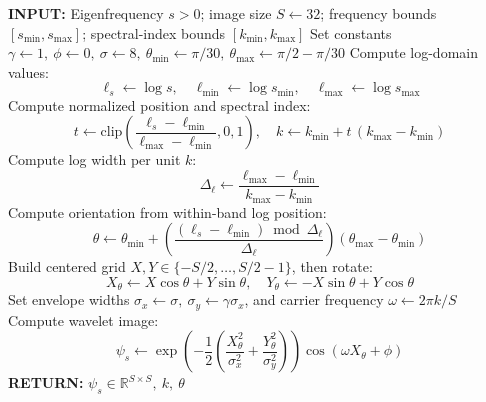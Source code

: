 \documentclass[preprint,review,12pt]{elsarticle}
\begin{document}
\begin{algorithm}[H]
\caption{Eigenfrequency Wavelet Encoding}
\label{alg:eigenfrequency_wavelet_encoding}
\begin{algorithmic}[1]
\STATE \textbf{INPUT:} Eigenfrequency \( s>0 \); image size \( S \leftarrow 32 \); frequency bounds \( [s_{\min}, s_{\max}] \); spectral-index bounds \( [k_{\min}, k_{\max}] \)
\STATE Set constants \( \gamma \leftarrow 1,\ \phi \leftarrow 0,\ \sigma \leftarrow 8,\ \theta_{\min}\leftarrow \pi/30,\ \theta_{\max}\leftarrow \pi/2-\pi/30 \)
\STATE Compute log-domain values:
\[
\ell_s \leftarrow \log s,\quad \ell_{\min}\leftarrow \log s_{\min},\quad \ell_{\max}\leftarrow \log s_{\max}
\]
\STATE Compute normalized position and spectral index:
\[
t \leftarrow \mathrm{clip}\!\left(\frac{\ell_s-\ell_{\min}}{\ell_{\max}-\ell_{\min}},0,1\right),\quad
k \leftarrow k_{\min} + t\,(k_{\max}-k_{\min})
\]
\STATE Compute log width per unit \(k\):
\[
\Delta_\ell \leftarrow \frac{\ell_{\max}-\ell_{\min}}{k_{\max}-k_{\min}}
\]
\STATE Compute orientation from within-band log position:
\[
\theta \leftarrow \theta_{\min} + \left(\frac{(\ell_s-\ell_{\min})\bmod \Delta_\ell}{\Delta_\ell}\right)\left(\theta_{\max}-\theta_{\min}\right)
\]
\STATE Build centered grid \(X,Y \in \{-S/2,\dots,S/2-1\}\), then rotate:
\[
X_\theta \leftarrow X\cos\theta + Y\sin\theta,\quad
Y_\theta \leftarrow -X\sin\theta + Y\cos\theta
\]
\STATE Set envelope widths \( \sigma_x \leftarrow \sigma,\ \sigma_y \leftarrow \gamma \sigma_x \), and carrier frequency \( \omega \leftarrow 2\pi k/S \)
\STATE Compute wavelet image:
\[
\psi_s \leftarrow
\exp\!\left(-\frac{1}{2}\left(\frac{X_\theta^2}{\sigma_x^2}+\frac{Y_\theta^2}{\sigma_y^2}\right)\right)\cos(\omega X_\theta+\phi)
\]
\STATE \textbf{RETURN:} \( \psi_s \in \mathbb{R}^{S\times S},\ k,\ \theta \)
\end{algorithmic}
\end{algorithm}
\end{document}

